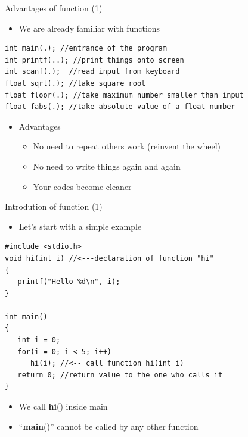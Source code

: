 \begin{frame}[fragile]{Advantages of function (1)}
\begin{itemize}
	\item {We are already familiar with functions}
\end{itemize}
\begin{lstlisting}
int main(.); //entrance of the program
int printf(..); //print things onto screen
int scanf(.);  //read input from keyboard
float sqrt(.); //take square root
float floor(.); //take maximum number smaller than input
float fabs(.); //take absolute value of a float number
\end{lstlisting}
\begin{itemize}
	\item {Advantages}
	\begin{itemize}
		\item {No need to repeat others work (reinvent the wheel)}
		\item {No need to write things again and again}
		\item {Your codes become cleaner}
	\end{itemize}
\end{itemize}
\end{frame}

\begin{frame}[fragile]{Introdution of function (1)}
\begin{itemize}
	\item {Let's start with a simple example}
\end{itemize}
\begin{lstlisting}
#include <stdio.h>
void hi(int i) //<---declaration of function "hi"
{
   printf("Hello %d\n", i);
}

int main()
{
   int i = 0;
   for(i = 0; i < 5; i++)
      hi(i); //<-- call function hi(int i)
   return 0; //return value to the one who calls it
}
\end{lstlisting}
\vspace{-0.15in}
\begin{itemize}
	\item {We call \textbf{hi}() inside main}
	\item {``\textbf{main}()'' cannot be called by any other function}
\end{itemize}
\end{frame}

